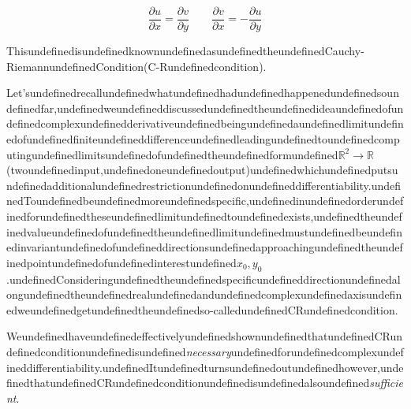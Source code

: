 \begin{equation}
\label{cr}
\boxed{\frac{\partial u}{\partial x} = \frac{\partial v}{\partial y} \qquad 
\frac{\partial v}{\partial x} =  - \frac{\partial u}{\partial y}}
\end{equation}

ThisundefinedisundefinedknownundefinedasundefinedtheundefinedCauchy-RiemannundefinedCondition(C-Rundefinedcondition).

Let'sundefinedrecallundefinedwhatundefinedhadundefinedhappenedundefinedsoundefinedfar,undefinedweundefineddiscussedundefinedtheundefinedideaundefinedofundefinedcomplexundefinedderivativeundefinedbeingundefinedaundefinedlimitundefinedofundefinedfiniteundefineddifferenceundefinedleadingundefinedtoundefinedcomputingundefinedlimitsundefinedofundefinedtheundefinedformundefined$\mathbb{R}^2\to \mathbb{R}$(twoundefinedinput,undefinedoneundefinedoutput)undefinedwhichundefinedputsundefinedadditionalundefinedrestrictionundefinedonundefineddifferentiability.undefinedToundefinedbeundefinedmoreundefinedspecific,undefinedinundefinedorderundefinedforundefinedtheseundefinedlimitundefinedtoundefinedexists,undefinedtheundefinedvalueundefinedofundefinedtheundefinedlimitundefinedmustundefinedbeundefinedinvariantundefinedofundefineddirectionsundefinedapproachingundefinedtheundefinedpointundefinedofundefinedinterestundefined$x_0, y_0$.undefinedConsideringundefinedtheundefinedspecificundefineddirectionundefinedalongundefinedtheundefinedrealundefinedandundefinedcomplexundefinedaxisundefinedweundefinedgetundefinedtheundefinedso-calledundefinedCRundefinedcondition.

WeundefinedhaveundefinedeffectivelyundefinedshownundefinedthatundefinedCRundefinedconditionundefinedisundefined\textit{necessary}undefinedforundefinedcomplexundefineddifferentiability.undefinedItundefinedturnsundefinedoutundefinedhowever,undefinedthatundefinedCRundefinedconditionundefinedisundefinedalsoundefined\textit{sufficient}.

